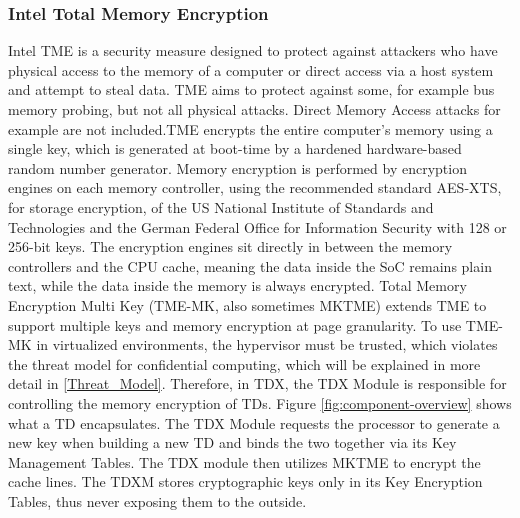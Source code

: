 \subsubsection{Intel Total Memory Encryption}
\label{Memory Encrpytion}
Intel \Gls{TME} is a security measure designed to protect against attackers who have physical access to the memory of a computer or direct access via a host system and attempt to steal data. TME aims to protect against some, for example bus memory probing, but not all physical attacks. Direct Memory Access attacks for example are not included.TME encrypts the entire computer's memory using a single key, which is generated at boot-time by a hardened hardware-based random number generator. Memory encryption is performed by encryption engines on each memory controller, using the recommended standard AES-XTS, for storage encryption, of the US National Institute of Standards and Technologies \cite{morris_dworkin_recommendation_2015} and the German Federal Office for Information Security with 128 or 256-bit keys\cite[~p. 24]{bundesamt_fur_sicherheit_in_der_informationstechnik_cryptographic_2023}. The encryption engines sit directly in between the memory controllers and the CPU cache, meaning the data inside the SoC remains plain text, while the data inside the memory is always encrypted. Total Memory Encryption Multi Key (TME-MK, also sometimes MKTME) extends TME to support multiple keys and memory encryption at page granularity. To use TME-MK in virtualized environments, the hypervisor must be trusted, which violates the threat model for confidential computing, which will be explained in more detail in \cref{Threat_Model}. Therefore, in TDX, the TDX Module is responsible for controlling the memory encryption of TDs. Figure \ref{fig:component-overview} shows what a TD encapsulates. The TDX Module requests the processor to generate a new key when building a new TD and binds the two together via its Key Management Tables. The TDX module then utilizes MKTME to encrypt the cache lines. The TDXM stores cryptographic keys only in its Key Encryption Tables, thus never exposing them to the outside\cite{cheng_intel_2023}. 

